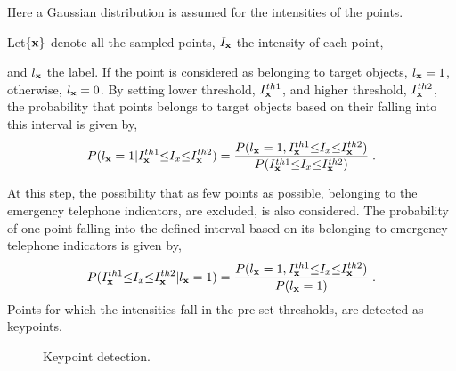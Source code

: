 Here a Gaussian distribution is assumed for the intensities of the points.




Let$\{\bf{x}\}$ denote all the sampled points, $I_{\bf{x}}$ the intensity of each point, 
and $l_{\bf{x}}$ the label. If the point is considered as belonging to target objects, $l_{\bf{x}}=1$, otherwise, $l_{\bf{x}}=0$. By setting lower threshold, $I^{th1}_{\bf{x}}$,  and higher threshold, $I^{th2}_{\bf{x}}$, the probability that points belongs to target objects based on their falling into this interval is given by,
\begin{equation}
P(l_{\bf{x}}=1|I^{th1}_{\bf{x}}{\leq}I_x{\leq}{I^{th2}_{\bf{x}}})=
\frac
{P(l_{\bf{x}}=1,I^{th1}_{\bf{x}}{\leq}I_x{\leq}{I^{th2}_{\bf{x}}})} {P(I^{th1}_{\bf{x}}{\leq}I_x{\leq}{I^{th2}_{\bf{x}}})}\;.
\label{eq1}
\end{equation}



At this step, the possibility that as few points as possible, belonging to the emergency telephone indicators, are excluded, is also considered. The probability of one point falling into the defined interval based on its belonging to emergency telephone indicators is given by,
\begin{equation}
P(I^{th1}_{\bf{x}}{\leq}I_x{\leq}{I^{th2}_{\bf{x}}}|l_{\bf{x}}=1)=
\frac
{P(l_{\bf{x}}=1,I^{th1}_{\bf{x}}{\leq}I_x{\leq}{I^{th2}_{\bf{x}}})} {P(l_{\bf{x}}=1)}\;.
\label{eq1.1}
\end{equation}
Points for which the intensities fall in the pre-set thresholds, are detected as keypoints.
\begin{figure}
\centering
{}
\caption[Keypoint detection]{Keypoint detection. }
\label{fig:sec}
\end{figure}


